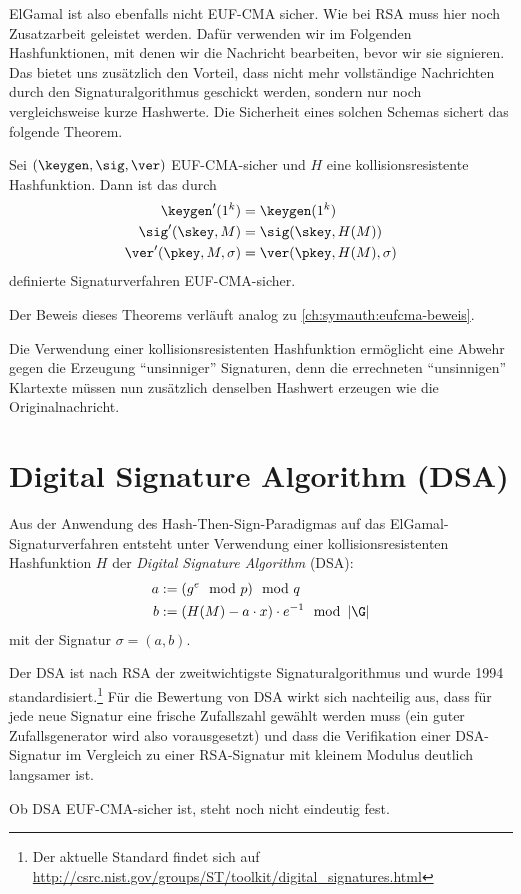 ElGamal ist also ebenfalls nicht EUF-CMA sicher. Wie bei RSA muss hier noch Zusatzarbeit geleistet werden. Dafür verwenden wir im
Folgenden Hashfunktionen, mit denen wir die Nachricht bearbeiten, bevor wir sie signieren. Das bietet uns zusätzlich den Vorteil, dass
nicht mehr vollständige Nachrichten durch den Signaturalgorithmus geschickt werden, sondern nur noch vergleichsweise kurze Hashwerte. Die Sicherheit eines solchen Schemas sichert das folgende Theorem.~\\

\begin{theorem}
Sei $(\keygen, \sig, \ver)$ EUF-CMA-sicher und $H$ eine kollisionsresistente Hashfunktion. Dann ist das durch 
\begin{align*}
\keygen'(1^k) &= \keygen(1^k)\\
\sig'(\skey,M) &= \sig(\skey,H(M))\\
\ver'(\pkey,M,\sigma) &= \ver(\pkey,H(M),\sigma)
\end{align*}
definierte Signaturverfahren EUF-CMA-sicher.~\\
\end{theorem}

Der Beweis dieses Theorems verläuft analog zu \ref{ch:symauth:eufcma-beweis}.

Die Verwendung einer kollisionsresistenten Hashfunktion ermöglicht eine Abwehr gegen die Erzeugung "`unsinniger"' Signaturen, denn die errechneten "`unsinnigen"' Klartexte müssen nun zusätzlich denselben Hashwert erzeugen wie die Originalnachricht.


\section{Digital Signature Algorithm (DSA)}
Aus der Anwendung des Hash-Then-Sign-Paradigmas auf das ElGamal-Signaturverfahren entsteht unter Verwendung einer kollisionsresistenten
Hashfunktion $H$ der \emph{Digital Signature Algorithm} (DSA):
\begin{align*}
a &:= (g^e \mod p) \mod q\\
b &:= (H(M) - a \cdot x) \cdot e^{-1} \mod \left|\G\right|
\end{align*}
mit der Signatur $\sigma = (a,b)$.

Der DSA ist nach RSA der zweitwichtigste Signaturalgorithmus und wurde 1994 standardisiert.\footnote{Der aktuelle Standard findet sich auf \url{http://csrc.nist.gov/groups/ST/toolkit/digital_signatures.html}} Für die Bewertung von DSA wirkt sich nachteilig aus, dass für jede neue Signatur eine frische Zufallszahl gewählt werden muss (ein guter Zufallsgenerator wird also
vorausgesetzt) und dass die Verifikation einer DSA-Signatur im Vergleich zu einer RSA-Signatur mit kleinem Modulus deutlich langsamer ist.

Ob DSA EUF-CMA-sicher ist, steht noch nicht eindeutig fest.
